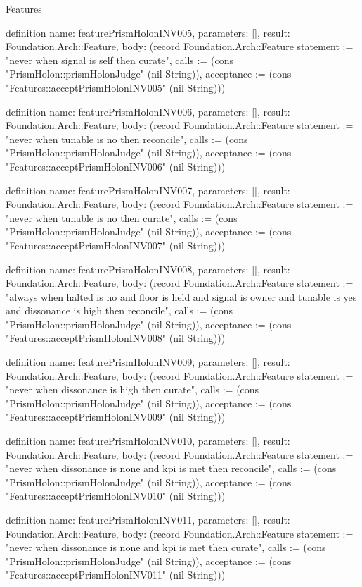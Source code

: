 \begin{lexlean}{Features}
\begin{semanticmodule}
definition{
  name: featurePrismHolonINV005,
  parameters: [],
  result: Foundation.Arch::Feature,
  body: (record Foundation.Arch::Feature {statement := "never when signal is self then curate", calls := (cons "PrismHolon::prismHolonJudge" (nil String)), acceptance := (cons "Features::acceptPrismHolonINV005" (nil String))})
}

definition{
  name: featurePrismHolonINV006,
  parameters: [],
  result: Foundation.Arch::Feature,
  body: (record Foundation.Arch::Feature {statement := "never when tunable is no then reconcile", calls := (cons "PrismHolon::prismHolonJudge" (nil String)), acceptance := (cons "Features::acceptPrismHolonINV006" (nil String))})
}

definition{
  name: featurePrismHolonINV007,
  parameters: [],
  result: Foundation.Arch::Feature,
  body: (record Foundation.Arch::Feature {statement := "never when tunable is no then curate", calls := (cons "PrismHolon::prismHolonJudge" (nil String)), acceptance := (cons "Features::acceptPrismHolonINV007" (nil String))})
}

definition{
  name: featurePrismHolonINV008,
  parameters: [],
  result: Foundation.Arch::Feature,
  body: (record Foundation.Arch::Feature {statement := "always when halted is no and floor is held and signal is owner and tunable is yes and dissonance is high then reconcile", calls := (cons "PrismHolon::prismHolonJudge" (nil String)), acceptance := (cons "Features::acceptPrismHolonINV008" (nil String))})
}

definition{
  name: featurePrismHolonINV009,
  parameters: [],
  result: Foundation.Arch::Feature,
  body: (record Foundation.Arch::Feature {statement := "never when dissonance is high then curate", calls := (cons "PrismHolon::prismHolonJudge" (nil String)), acceptance := (cons "Features::acceptPrismHolonINV009" (nil String))})
}

definition{
  name: featurePrismHolonINV010,
  parameters: [],
  result: Foundation.Arch::Feature,
  body: (record Foundation.Arch::Feature {statement := "never when dissonance is none and kpi is met then reconcile", calls := (cons "PrismHolon::prismHolonJudge" (nil String)), acceptance := (cons "Features::acceptPrismHolonINV010" (nil String))})
}

definition{
  name: featurePrismHolonINV011,
  parameters: [],
  result: Foundation.Arch::Feature,
  body: (record Foundation.Arch::Feature {statement := "never when dissonance is none and kpi is met then curate", calls := (cons "PrismHolon::prismHolonJudge" (nil String)), acceptance := (cons "Features::acceptPrismHolonINV011" (nil String))})
}


\end{semanticmodule}
\end{lexlean}
